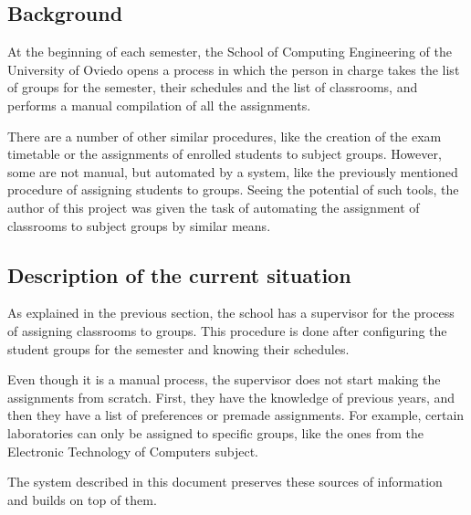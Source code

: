 \subsection{Background}

At the beginning of each semester, the School of Computing Engineering of the University of Oviedo opens a process in which the person in charge takes the list of groups for the semester, their schedules and the list of classrooms, and performs a manual compilation of all the assignments.

There are a number of other similar procedures, like the creation of the exam timetable or the assignments of enrolled students to subject groups. However, some are not manual, but automated by a system, like the previously mentioned procedure of assigning students to groups. Seeing the potential of such tools, the author of this project was given the task of automating the assignment of classrooms to subject groups by similar means. 

\subsection{Description of the current situation}

As explained in the previous section, the school has a supervisor for the process of assigning classrooms to groups. This procedure is done after configuring the student groups for the semester and knowing their schedules.

Even though it is a manual process, the supervisor does not start making the assignments from scratch. First, they have the knowledge of previous years, and then they have a list of preferences or premade assignments. For example, certain laboratories can only be assigned to specific groups, like the ones from the Electronic Technology of Computers subject.

The system described in this document preserves these sources of information and builds on top of them.


